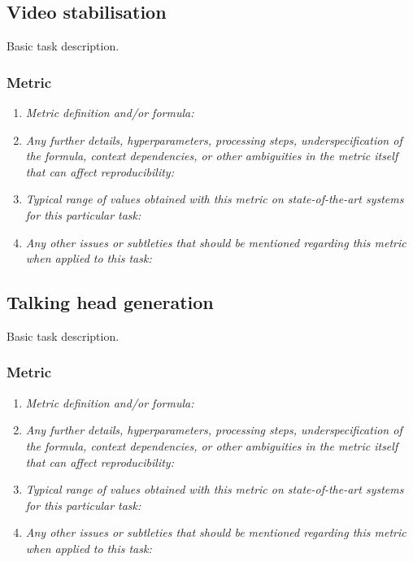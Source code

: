 \documentclass[a4paper,11pt]{article}
\begin{document}
    \subsection{Video stabilisation}
        Basic task description.
        \subsubsection{Metric}
            \begin{enumerate}[label=\alph*.]
                \item \textit{Metric definition and/or formula:}
                \bigskip
                \item \textit{Any further details, hyperparameters, processing steps, underspecification of the formula, context dependencies, or other ambiguities in the metric itself that can affect reproducibility:}
                \bigskip
                \item \textit{Typical range of values obtained with this metric on state-of-the-art systems for this particular task:}
                \bigskip
                \item \textit{Any other issues or subtleties that should be mentioned regarding this metric when applied to this task:}
                \bigskip
            \end{enumerate}

    \subsection{Talking head generation}
    Basic task description.
    \subsubsection{Metric}
        \begin{enumerate}[label=\alph*.]
            \item \textit{Metric definition and/or formula:}
            \bigskip
            \item \textit{Any further details, hyperparameters, processing steps, underspecification of the formula, context dependencies, or other ambiguities in the metric itself that can affect reproducibility:}
            \bigskip
            \item \textit{Typical range of values obtained with this metric on state-of-the-art systems for this particular task:}
            \bigskip
            \item \textit{Any other issues or subtleties that should be mentioned regarding this metric when applied to this task:}
            \bigskip
        \end{enumerate}
\end{document}

